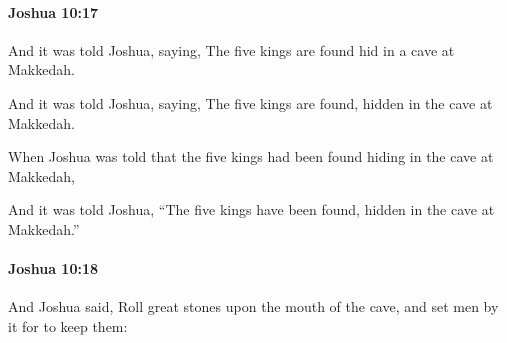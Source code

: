 		\paragraph{Joshua 10:17} %
			\label{JOSHUA-10-17}

			And it was told Joshua, saying, The five kings are found hid in a cave at Makkedah.

			\begin{versebox}
					\item[BHS] 
					\item[ASV] And it was told Joshua, saying, The five kings are found, hidden in the cave at Makkedah.
					\item[NIV] When Joshua was told that the five kings had been found hiding in the cave at Makkedah,
					\item[NRSV] And it was told Joshua, “The five kings have been found, hidden in the cave at Makkedah.”
			\end{versebox}

		\paragraph{Joshua 10:18} %
			\label{JOSHUA-10-18}

			And Joshua said, Roll great stones upon the mouth of the cave, and set men by it for to keep them:

